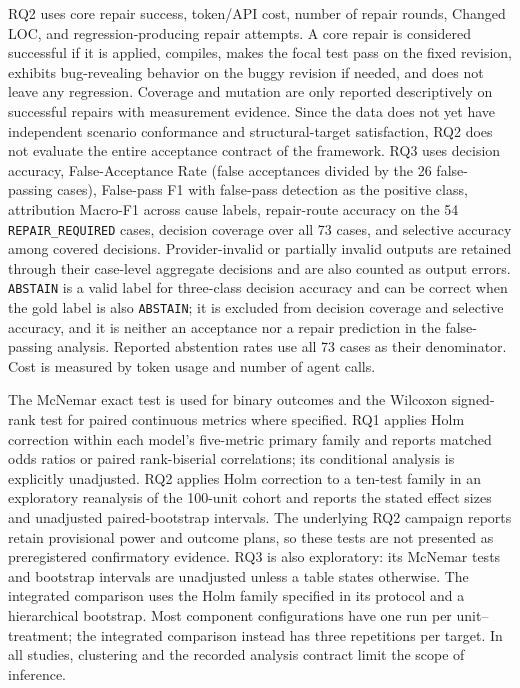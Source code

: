 \documentclass[pdflatex,sn-basic,Numbered,iicol]{sn-jnl}
\begin{document}
RQ2 uses core repair success, token/API cost, number of repair rounds, Changed LOC, and regression-producing repair attempts. A core repair is considered successful if it is applied, compiles, makes the focal test pass on the fixed revision, exhibits bug-revealing behavior on the buggy revision if needed, and does not leave any regression. Coverage and mutation are only reported descriptively on successful repairs with measurement evidence. Since the data does not yet have independent scenario conformance and structural-target satisfaction, RQ2 does not evaluate the entire acceptance contract of the framework. RQ3 uses decision accuracy, False-Acceptance Rate (false acceptances divided by the 26 false-passing cases), False-pass F1 with false-pass detection as the positive class, attribution Macro-F1 across cause labels, repair-route accuracy on the 54 \texttt{REPAIR\_REQUIRED} cases, decision coverage over all 73 cases, and selective accuracy among covered decisions. Provider-invalid or partially invalid outputs are retained through their case-level aggregate decisions and are also counted as output errors. \texttt{ABSTAIN} is a valid label for three-class decision accuracy and can be correct when the gold label is also \texttt{ABSTAIN}; it is excluded from decision coverage and selective accuracy, and it is neither an acceptance nor a repair prediction in the false-passing analysis. Reported abstention rates use all 73 cases as their denominator. Cost is measured by token usage and number of agent calls.

The McNemar exact test is used for binary outcomes and the Wilcoxon signed-rank test for paired continuous metrics where specified. RQ1 applies Holm correction within each model's five-metric primary family and reports matched odds ratios or paired rank-biserial correlations; its conditional analysis is explicitly unadjusted. RQ2 applies Holm correction to a ten-test family in an exploratory reanalysis of the 100-unit cohort and reports the stated effect sizes and unadjusted paired-bootstrap intervals. The underlying RQ2 campaign reports retain provisional power and outcome plans, so these tests are not presented as preregistered confirmatory evidence. RQ3 is also exploratory: its McNemar tests and bootstrap intervals are unadjusted unless a table states otherwise. The integrated comparison uses the Holm family specified in its protocol and a hierarchical bootstrap. Most component configurations have one run per unit--treatment; the integrated comparison instead has three repetitions per target. In all studies, clustering and the recorded analysis contract limit the scope of inference.
\end{document}
